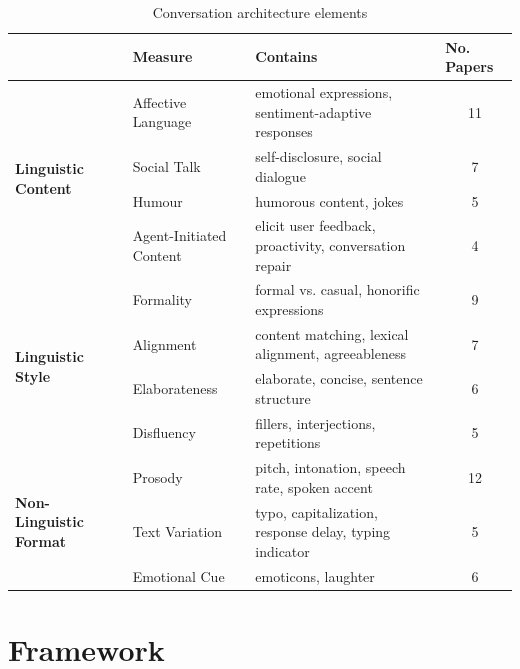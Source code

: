\documentclass[sigconf,screen,review, anonymous]{acmart}
\begin{document}
\begin{table}[]
\begin{tabular}{@{}lllc@{}}
\toprule
 & \textbf{Measure}      & \textbf{Contains}                                      & \multicolumn{1}{l}{\textbf{No. Papers}} \\ \midrule
\multirow{4}{*}{\textbf{Linguistic Content}}    & Affective Language & emotional expressions, sentiment-adaptive responses & 11 \\
 & Social Talk           & self-disclosure, social dialogue                       & 7                                       \\
 & Humour                & humorous content, jokes                                & 5                                       \\
 & Agent-Initiated Content & elicit user feedback, proactivity, conversation repair & 4                                       \\ \midrule
\multirow{4}{*}{\textbf{Linguistic Style}}      & Formality          & formal vs. casual, honorific expressions                               & 9  \\
 & Alignment             & content matching, lexical alignment, agreeableness     & 7                                       \\
 & Elaborateness         & elaborate, concise, sentence structure                 & 6                                       \\
 & Disfluency            & fillers, interjections, repetitions                    & 5                                       \\ \midrule
\multirow{3}{*}{\textbf{Non-Linguistic Format}} & Prosody            & pitch, intonation, speech rate, spoken accent                          & 12 \\
 & Text Variation        & typo, capitalization, response delay, typing indicator & 5                                       \\
 & Emotional Cue         & emoticons, laughter                                    & 6                                       \\ \bottomrule
\end{tabular}%
\caption{Conversation architecture elements}
\label{tab:cues}
\end{table}


\section{Framework}
\end{document}
